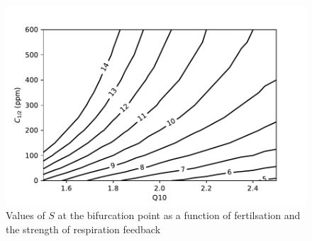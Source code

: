 \begin{figure}
  \centering
  \includegraphics[keepaspectratio,wisth=\textwidth]{imogen_critical_S_Q10_ca05}
  \caption{Values of $S$ at the bifurcation point as a function of  fertilsation and the strength of respiration feedback}
  \label{fig:imogen_bifurcation_plane}
\end{figure}